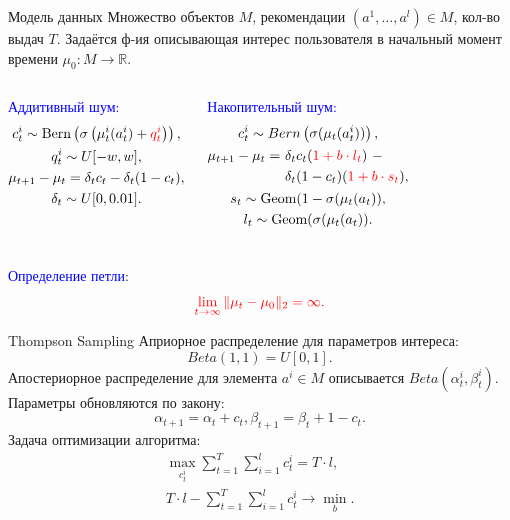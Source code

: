\documentclass{beamer}
\begin{document}
\begin{frame}{Модель данных}
  Множество объектов $M$, рекомендации $(a^1, \dots, a^l) \in M$, кол-во выдач $T$.
  Задаётся ф-ия описывающая интерес пользователя  в начальный момент времени $\mu_0 : M \to \mathbb{R}$.

\bigskip

\begin{columns}[T]
\textcolor{blue}{Аддитивный шум:}   
\begin{gather*}
    c_t^i \sim \text{Bern} \left(\sigma\left(\mu_t^i (a_t^i) + \mathbin{\color{red} q_t^i } \right) \right), \\ 
    q_t^i \sim U[-w, w], \\
\mu_{t+1} - \mu_{t} = \delta_t c_t - \delta_t (1 - c_t), \\
\delta_t \sim U[0, 0.01].
  \end{gather*}

\textcolor{blue}{Накопительный шум:}   
\begin{gather*}
  c_t^i \sim Bern \left(\sigma(\mu_t(a_t^i)) \right), \\
  \begin{align*}
    \mu_{t+1} - \mu_{t} =~&\delta_t c_t (\mathbin{ \color{red} 1 + b \cdot l_t})~- \\ 
                        &\delta_t (1 - c_t) (\mathbin{ \color{red} 1 + b \cdot s_t}),
\end{align*} \\
  s_t \sim \text{Geom}(1 - \sigma(\mu_t(a_t)), \\
  l_t \sim \text{Geom}(\sigma(\mu_t(a_t)). 
\end{gather*}
\end{columns}
\bigskip
\textcolor{blue}{Определение петли}:
\begin{gather*}
  \color{red} \lim_{t \to \infty} \|\mu_t - \mu_0 \|_2 = \infty.
\end{gather*}
\end{frame}
\begin{frame}{Thompson Sampling}
Априорное распределение для параметров интереса: 
\[Beta(1, 1) = U[0, 1].\] 
Апостериорное распределение для элемента $a^i \in M$ описывается $Beta(\alpha_t^i, \beta_t^i)$. 
Параметры обновляются по закону:
\[\alpha_{t+1} = \alpha_t + c_t, \beta_{t+1} = \beta_t + 1 - c_t.\]
Задача оптимизации алгоритма:
\begin{gather*}  
\max_{c_t^i} \sum_{t = 1}^T \sum_{i = 1}^l c_t^i = T \cdot l,\\ 
   T \cdot l - \sum_{t = 1}^T \sum_{i = 1}^l c_t^i \to \min_{b}. 
\end{gather*}
\end{frame}
\end{document}
